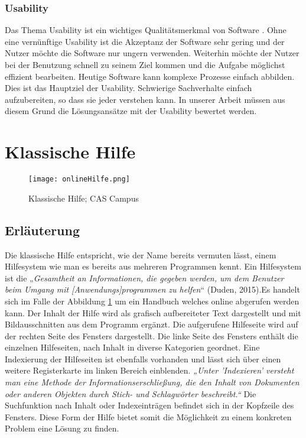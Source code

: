 \subsubsection{Usability}
Das Thema Usability ist ein wichtiges Qualitätsmerkmal von Software \cite{usability}. Ohne eine vernünftige Usability ist die Akzeptanz der Software sehr gering und der Nutzer möchte die Software nur ungern verwenden. Weiterhin möchte der Nutzer bei der Benutzung schnell zu seinem Ziel kommen und die Aufgabe möglichst effizient bearbeiten. Heutige Software kann komplexe Prozesse einfach abbilden. Dies ist das Hauptziel der Usability. Schwierige Sachverhalte einfach aufzubereiten, so dass sie jeder verstehen kann. In unserer Arbeit müssen aus diesem Grund die Lösungsansätze mit der Usability bewertet werden.

\section{Klassische Hilfe}

\begin{figure}[ht]
\begin{center}
\texttt{[image: onlineHilfe.png]}
\caption{Klassische Hilfe; CAS Campus}
\label{img1:helpSystem}
\end{center}
\end{figure} 
\subsection{Erläuterung}
Die klassische Hilfe entspricht, wie der Name bereits vermuten lässt, einem Hilfesystem wie man es bereits aus mehreren Programmen kennt. Ein Hilfesystem ist die „\textit{Gesamtheit an Informationen, die gegeben werden, um dem Benutzer beim Umgang mit [Anwendungs]programmen zu helfen}“ (Duden, 2015).Es handelt sich im Falle der Abbildung \ref{img1:helpSystem} um ein Handbuch welches online abgerufen werden kann. Der Inhalt der Hilfe wird als grafisch aufbereiteter Text dargestellt und mit Bildausschnitten aus dem Programm ergänzt. Die aufgerufene Hilfeseite wird auf der rechten Seite des Fensters dargestellt. Die linke Seite des Fensters enthält die einzelnen Hilfeseiten, nach Inhalt in diverse Kategorien geordnet. Eine Indexierung der Hilfeseiten ist ebenfalls vorhanden und lässt sich über einen weitere Registerkarte im linken Bereich einblenden. \textit{„Unter 'Indexieren' versteht man eine Methode der Informationserschließung, die den Inhalt von Dokumenten oder anderen Objekten durch Stich- und Schlagwörter beschreibt.“} \cite{indexierung} Die Suchfunktion nach Inhalt oder Indexeinträgen befindet sich in der Kopfzeile des Fensters. Diese Form der Hilfe bietet somit die Möglichkeit zu einem konkreten Problem eine Lösung zu finden. \par

